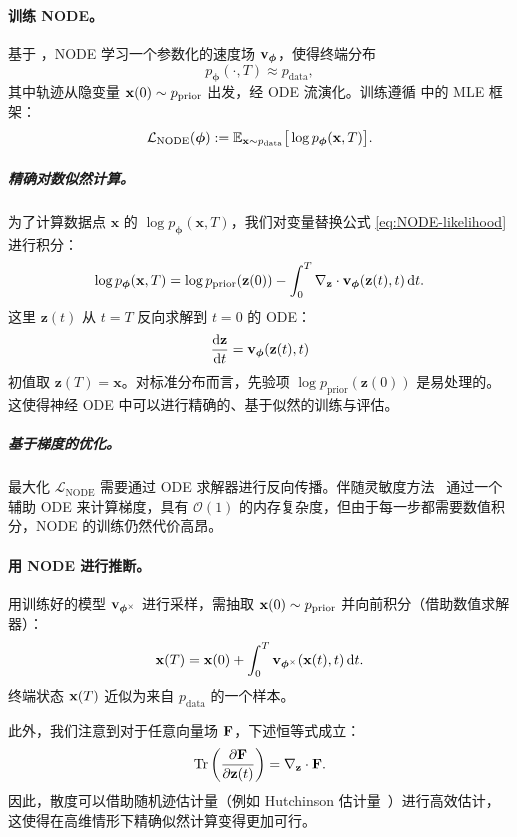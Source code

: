 \paragraph{训练 NODE。}
基于 ，NODE 学习一个参数化的速度场 ${\mathbf{v}}_{\bm{\phi}}$，使得终端分布
\[
p_{\bm{\phi}}(\cdot, T) \approx p_{\text{data}},
\]
其中轨迹从隐变量 ${\mathbf{x}}(0) \sim p_{\text{prior}}$ 出发，经 ODE 流演化。训练遵循  中的 MLE 框架：
\[
\mathcal{L}_{\text{NODE}}(\bm{\phi}) := \mathbb{E}_{{\mathbf{x}} \sim p_{\text{data}}} \big[\log p_{\bm{\phi}}({\mathbf{x}}, T)\big].
\]

\subparagraph{精确对数似然计算。}
为了计算数据点 $\mathbf{x}$ 的 $\log p_{\bm{\phi}}(\mathbf{x}, T)$，我们对变量替换公式 \eqref{eq:NODE-likelihood} 进行积分：
\begin{align}
\log p_{\bm{\phi}}(\mathbf{x}, T) = \log p_{\text{prior}}(\mathbf{z}(0)) - \int_0^T \nabla_{\mathbf{z}} \cdot \mathbf{v}_{\bm{\phi}}(\mathbf{z}(t), t) \mathop{}\!\mathrm{d} t.
\end{align}
这里 $\mathbf{z}(t)$ 从 $t = T$ 反向求解到 $t = 0$ 的 ODE：
\[
\frac{\mathop{}\!\mathrm{d}\mathbf{z}}{\mathop{}\!\mathrm{d} t} = \mathbf{v}_{\bm{\phi}}(\mathbf{z}(t), t)
\]
初值取 $\mathbf{z}(T) = \mathbf{x}$。对标准分布而言，先验项 $\log p_{\text{prior}}(\mathbf{z}(0))$ 是易处理的。这使得神经 ODE 中可以进行精确的、基于似然的训练与评估。

\subparagraph{基于梯度的优化。}
最大化 $\mathcal{L}_{\text{NODE}}$ 需要通过 ODE 求解器进行反向传播。伴随灵敏度方法~\citep{pontryagin2018mathematical, chen2018neural} 通过一个辅助 ODE 来计算梯度，具有 $\mathcal{O}(1)$ 的内存复杂度，但由于每一步都需要数值积分，NODE 的训练仍然代价高昂。

\paragraph{用 NODE 进行推断。}
用训练好的模型 ${\mathbf{v}}_{\bm{\phi}^\times}$ 进行采样，需抽取 ${\mathbf{x}}(0) \sim p_{\text{prior}}$ 并向前积分（借助数值求解器）：
\[
{\mathbf{x}}(T) = {\mathbf{x}}(0) + \int_0^T {\mathbf{v}}_{\bm{\phi}^\times}({\mathbf{x}}(t), t)   \mathop{}\!\mathrm{d} t.
\]
终端状态 ${\mathbf{x}}(T)$ 近似为来自 $p_{\text{data}}$ 的一个样本。

此外，我们注意到对于任意向量场 ${\mathbf{F}}$，下述恒等式成立：
\[
    \operatorname{Tr}\left(\frac{\partial {\mathbf{F}}}{\partial {\mathbf{z}}(t)} \right) = \nabla_{{\mathbf{z}}} \cdot {\mathbf{F}}.
\]
因此，散度可以借助随机迹估计量（例如 Hutchinson 估计量~\citep{hutchinson1989stochastic}）进行高效估计，这使得在高维情形下精确似然计算变得更加可行。


